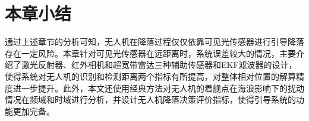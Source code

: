 \section{本章小结}
通过上述章节的分析可知，无人机在降落过程仅仅依靠可见光传感器进行引导降落存在一定风险。本章针对可见光传感器在远距离时，系统误差较大的情况，主要介绍了激光反射器、红外相机和超宽带雷达三种辅助传感器和EKF滤波器的设计，使得系统对无人机的识别和检测距离两个指标有所提高，对整体相对位置的解算精度进一步提升。此外，本文还使用经典方法对无人机的着舰点在海浪影响下的扰动情况在频域和时域进行分析，并设计无人机降落决策评价指标，使得引导系统的功能更加完备。
 
% 	
%
%
%
